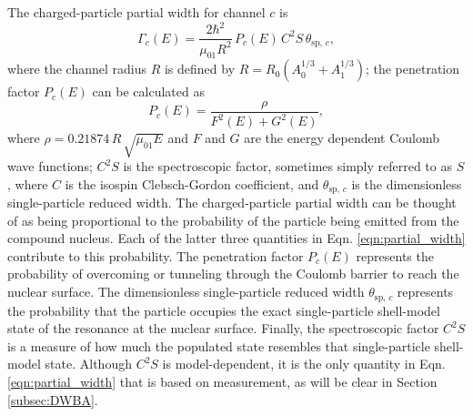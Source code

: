 The charged-particle partial width for channel $c$ is
\begin{equation} \label{eqn:partial_width}
\Gamma_{c}(E) = \frac{2 \hbar^{2}}{\mu_{01} R^{2}} \, P_{c}(E) \, C^{2}S \, \theta_{\mathrm{sp}, \, c},
\end{equation}
where the channel radius $R$ is defined by $R = R_{0} \left( A_{0}^{1/3} + A_{1}^{1/3} \right)$; the penetration factor $P_{c}(E)$ can be calculated as
\begin{equation} \label{eqn:pen_factor}
P_{c}(E) = \frac{\rho}{F^{2}(E) + G^{2}(E)},
\end{equation}
where $\rho = 0.21874 \, R \, \sqrt{\mu_{01} E}$ and $F$ and $G$ are the energy dependent Coulomb wave functions; $C^{2}S$ is the spectroscopic factor, sometimes simply referred to as $S$, where $C$ is the isospin Clebsch-Gordon coefficient, and $\theta_{\mathrm{sp}, \, c}$ is the dimensionless single-particle reduced width. The charged-particle partial width can be thought of as being proportional to the probability of the particle being emitted from the compound nucleus. Each of the latter three quantities in Eqn. \ref{eqn:partial_width} contribute to this probability. The penetration factor $P_{c}(E)$ represents the probability of overcoming or tunneling through the Coulomb barrier to reach the nuclear surface. The dimensionless single-particle reduced width $\theta_{\mathrm{sp}, \, c}$ represents the probability that the particle occupies the exact single-particle shell-model state of the resonance at the nuclear surface. Finally, the spectroscopic factor $C^{2}S$ is a measure of how much the populated state resembles that single-particle shell-model state. Although $C^{2}S$ is model-dependent, it is the only quantity in Eqn. \ref{eqn:partial_width} that is based on measurement, as will be clear in Section \ref{subsec:DWBA}.

